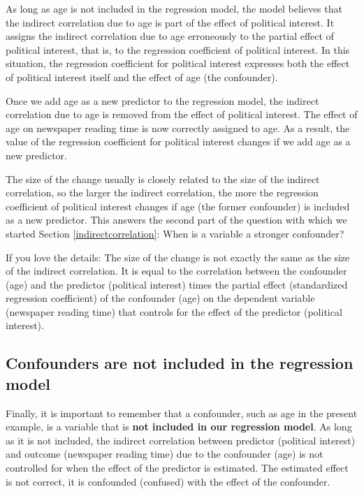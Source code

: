 \documentclass[a4paper]{book}
\theoremstyle{definition}
\theoremstyle{definition}
\theoremstyle{definition}
\theoremstyle{remark}
\begin{document}
As long as age is not included in the regression model, the model
believes that the indirect correlation due to age is part of the effect
of political interest. It assigns the indirect correlation due to age
erroneously to the partial effect of political interest, that is, to the
regression coefficient of political interest. In this situation, the
regression coefficient for political interest expresses both the effect
of political interest itself and the effect of age (the confounder).

Once we add age as a new predictor to the regression model, the indirect
correlation due to age is removed from the effect of political interest.
The effect of age on newspaper reading time is now correctly assigned to
age. As a result, the value of the regression coefficient for political
interest changes if we add age as a new predictor.

The size of the change usually is closely related to the size of the
indirect correlation, so the larger the indirect correlation, the more
the regression coefficient of political interest changes if age (the
former confounder) is included as a new predictor. This answers the
second part of the question with which we started Section
\ref{indirectcorrelation}: When is a variable a stronger confounder?

If you love the details: The size of the change is not exactly the same
as the size of the indirect correlation. It is equal to the correlation
between the confounder (age) and the predictor (political interest)
times the partial effect (standardized regression coefficient) of the
confounder (age) on the dependent variable (newspaper reading time) that
controls for the effect of the predictor (political interest).

\subsection{Confounders are not included in the regression
model}\label{confounders-are-not-included-in-the-regression-model}

Finally, it is important to remember that a confounder, such as age in
the present example, is a variable that is \textbf{not included in our
regression model}. As long as it is not included, the indirect
correlation between predictor (political interest) and outcome
(newspaper reading time) due to the confounder (age) is not controlled
for when the effect of the predictor is estimated. The estimated effect
is not correct, it is confounded (confused) with the effect of the
confounder.
\end{document}
